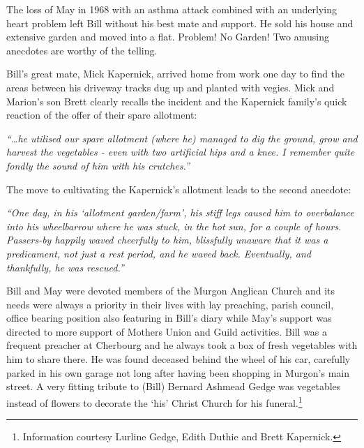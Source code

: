 The loss of May in 1968 with an asthma attack combined with an underlying heart problem left Bill without his best mate and support. He sold his house and extensive garden and moved into a flat. Problem! No Garden! Two amusing anecdotes are worthy of the telling.



Bill's great mate, Mick Kapernick, arrived home from work one day to find the areas between his driveway tracks dug up and planted with vegies. Mick and Marion's son Brett clearly recalls the incident and the Kapernick family's quick reaction of the offer of their spare allotment:



\emph{``\ldots he utilised our spare allotment (where he) managed to dig the ground, grow and harvest the vegetables - even with two artificial hips and a knee. I remember quite fondly the sound of him with his crutches.''}



The move to cultivating the Kapernick's allotment leads to the second anecdote:



\emph{``One day, in his `allotment garden/farm', his stiff legs caused him to overbalance into his wheelbarrow where he was stuck, in the hot sun, for a couple of hours. Passers-by happily waved cheerfully to him, blissfully unaware that it was a predicament, not just a rest period, and he waved back. Eventually, and thankfully, he was rescued.''}



Bill and May were devoted members of the Murgon Anglican Church and its needs were always a priority in their lives with lay preaching, parish council, office bearing position also featuring in Bill's diary while May's support was directed to more support of Mothers Union and Guild activities. Bill was a frequent preacher at Cherbourg and he always took a box of fresh vegetables with him to share there. He was found deceased behind the wheel of his car, carefully parked in his own garage not long after having been shopping in Murgon's main street. A very fitting tribute to (Bill) Bernard Ashmead Gedge was vegetables instead of flowers to decorate the `his' Christ Church for his funeral.\footnote{Information courtesy Lurline Gedge, Edith Duthie and Brett Kapernick.}








